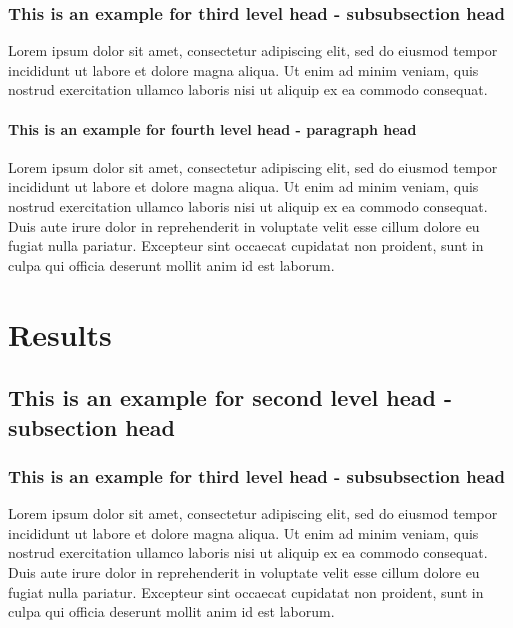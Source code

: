 \documentclass[unnumsec,webpdf,contemporary,large]{oup-authoring-template}%
\theoremstyle{thmstyleone}%
\theoremstyle{thmstyletwo}%
\theoremstyle{thmstylethree}%
\begin{document}
\subsubsection{This is an example for third level head - subsubsection head}\label{subsubsec1}

Lorem ipsum dolor sit amet, consectetur adipiscing elit, sed do
eiusmod tempor incididunt ut labore et dolore magna aliqua. Ut enim ad minim veniam, quis nostrud exercitation ullamco laboris nisi ut aliquip ex ea commodo consequat. %

\paragraph{This is an example for fourth level head - paragraph head}

Lorem ipsum dolor sit amet, consectetur adipiscing elit, sed do eiusmod tempor incididunt ut labore et dolore magna aliqua. Ut enim ad minim veniam, quis nostrud exercitation ullamco laboris nisi ut aliquip ex ea commodo consequat. Duis aute irure dolor in reprehenderit in voluptate velit esse cillum dolore eu fugiat nulla pariatur. Excepteur sint occaecat cupidatat non proident, sunt in culpa qui officia deserunt mollit anim id est laborum.

\section{Results}\label{results}

\subsection{This is an example for second level head - subsection head}\label{subsec2}

\subsubsection{This is an example for third level head - subsubsection head}\label{subsubsec2}

Lorem ipsum dolor sit amet, consectetur adipiscing elit, sed do eiusmod tempor incididunt ut labore et dolore magna aliqua. Ut enim ad minim veniam, quis nostrud exercitation ullamco laboris nisi ut aliquip ex ea commodo consequat. Duis aute irure dolor in reprehenderit in voluptate velit esse cillum dolore eu fugiat nulla pariatur. Excepteur sint occaecat cupidatat non proident, sunt in culpa qui officia deserunt mollit anim id est laborum.
\end{document}
